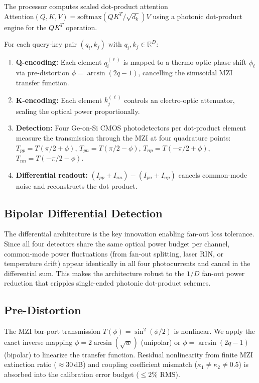 \documentclass[conference]{IEEEtran}
\begin{document}
The processor computes scaled dot-product attention
$\text{Attention}(Q,K,V)=\text{softmax}(QK^T/\sqrt{d_k})V$ using
a photonic dot-product engine for the $QK^T$ operation.

For each query-key pair $(q_i, k_j)$ with $q_i,k_j\in\mathbb{R}^D$:

\begin{enumerate}
    \item \textbf{Q-encoding:} Each element $q_i^{(\ell)}$ is mapped
          to a thermo-optic phase shift $\phi_\ell$ via pre-distortion
          $\phi = \arcsin(2q-1)$, cancelling the sinusoidal MZI
          transfer function.
    \item \textbf{K-encoding:} Each element $k_j^{(\ell)}$ controls
          an electro-optic attenuator, scaling the optical power
          proportionally.
    \item \textbf{Detection:} Four Ge-on-Si CMOS photodetectors
          per dot-product element measure the transmission through
          the MZI at four quadrature points:
          $T_{pp}=T(\pi/2+\phi)$, $T_{pn}=T(\pi/2-\phi)$,
          $T_{np}=T(-\pi/2+\phi)$, $T_{nn}=T(-\pi/2-\phi)$.
    \item \textbf{Differential readout:}
          $(I_{pp}+I_{nn})-(I_{pn}+I_{np})$ cancels common-mode
          noise and reconstructs the dot product.
\end{enumerate}

\subsection{Bipolar Differential Detection}

The differential architecture is the key innovation enabling fan-out
loss tolerance. Since all four detectors share the same optical power
budget per channel, common-mode power fluctuations (from fan-out
splitting, laser RIN, or temperature drift) appear identically in
all four photocurrents and cancel in the differential sum. This
makes the architecture robust to the $1/D$ fan-out power reduction
that cripples single-ended photonic dot-product schemes.

\subsection{Pre-Distortion}

The MZI bar-port transmission $T(\phi)=\sin^2(\phi/2)$ is nonlinear.
We apply the exact inverse mapping $\phi=2\arcsin(\sqrt{w})$ (unipolar)
or $\phi=\arcsin(2q-1)$ (bipolar) to linearize the transfer function.
Residual nonlinearity from finite MZI extinction ratio ($\approx30$\,dB)
and coupling coefficient mismatch ($\kappa_1\neq\kappa_2\neq0.5$) is
absorbed into the calibration error budget ($\le2\%$ RMS).
\end{document}
